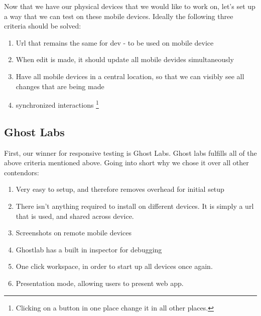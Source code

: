 Now that we have our physical devices that we would like to work on, let's set
up a way that we can test on these mobile devices. Ideally the following three
criteria should be solved:
\begin{enumerate}
  \item Url that remains the same for dev - to be used on mobile device
  \item When edit is made, it should update all mobile devides simultaneously
  \item Have all mobile devices in a central location, so that we can visibly
  see all changes that are being made
  \item synchronized interactions \footnote{Clicking on a button in one place
  change it in all other places.}
\end{enumerate}

\subsection{ Ghost Labs }

First, our winner for responsive testing is Ghost Labs. Ghost labs fulfills all
of the above criteria mentioned above. Going into short why we chose it over
all other contendors:
\begin{enumerate}
  \item Very easy to setup, and therefore removes overhead for initial setup
  \item There isn't anything required to install on different devices. It is
  simply a url that is used, and shared across device.
  \item Screenshots on remote mobile devices
  \item Ghostlab has a built in inspector for debugging
  \item One click workspace, in order to start up all devices once again.
  \item Presentation mode, allowing users to present web app.
\end{enumerate}


